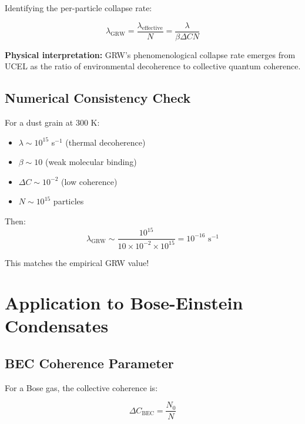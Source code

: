 \documentclass[12pt,a4paper]{article}
\begin{document}
Identifying the per-particle collapse rate:

\begin{equation}
\lambda_{\text{GRW}} = \frac{\lambda_{\text{effective}}}{N} = \frac{\lambda}{\beta \Delta C N}
\tag{S14}
\end{equation}

\textbf{Physical interpretation:} GRW's phenomenological collapse rate emerges from UCEL as the ratio of environmental decoherence to collective quantum coherence.

\subsection{Numerical Consistency Check}

For a dust grain at 300 K:
\begin{itemize}
    \item $\lambda \sim 10^{15}$ s$^{-1}$ (thermal decoherence)
    \item $\beta \sim 10$ (weak molecular binding)
    \item $\Delta C \sim 10^{-2}$ (low coherence)
    \item $N \sim 10^{15}$ particles
\end{itemize}

Then:
\begin{equation}
\lambda_{\text{GRW}} \sim \frac{10^{15}}{10 \times 10^{-2} \times 10^{15}} = 10^{-16} \text{ s}^{-1}
\tag{S15}
\end{equation}

This matches the empirical GRW value!

\section{Application to Bose-Einstein Condensates}

\subsection{BEC Coherence Parameter}

For a Bose gas, the collective coherence is:

\begin{equation}
\Delta C_{\text{BEC}} = \frac{N_0}{N}
\tag{S16}
\end{equation}
\end{document}
